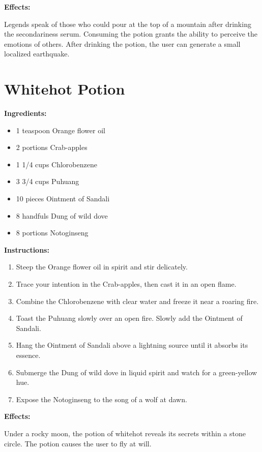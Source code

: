 \documentclass{article}
\begin{document}
\textbf{Effects:}

Legends speak of those who could pour at the top of a mountain after drinking the secondariness serum. Consuming the potion grants the ability to perceive the emotions of others. After drinking the potion, the user can generate a small localized earthquake.

\newpage
\section*{Whitehot Potion}

\textbf{Ingredients:}

\begin{itemize}
  \item 1 teaspoon Orange flower oil
  \item 2 portions Crab-apples
  \item 1 1/4 cups Chlorobenzene
  \item 3 3/4 cups Puhuang
  \item 10 pieces Ointment of Sandali
  \item 8 handfuls Dung of wild dove
  \item 8 portions Notoginseng
\end{itemize}

\textbf{Instructions:}

\begin{enumerate}
  \item Steep the Orange flower oil in spirit and stir delicately.
  \item Trace your intention in the Crab-apples, then cast it in an open flame.
  \item Combine the Chlorobenzene with clear water and freeze it near a roaring fire.
  \item Toast the Puhuang slowly over an open fire. Slowly add the Ointment of Sandali.
  \item Hang the Ointment of Sandali above a lightning source until it absorbs its essence.
  \item Submerge the Dung of wild dove in liquid spirit and watch for a green-yellow hue.
  \item Expose the Notoginseng to the song of a wolf at dawn.
\end{enumerate}

\textbf{Effects:}

Under a rocky moon, the potion of whitehot reveals its secrets within a stone circle. The potion causes the user to fly at will.
\end{document}
